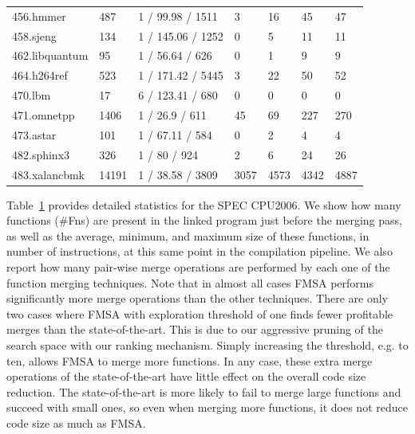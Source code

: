 \begin{table}[h]
{\begin{tabular}{lllllll}
                     456.hmmer          & 487    & 1 / 99.98 / 1511   & \small 3      & \small 16    & \small 45   & \small 47   \\
\rowcolor{evencolor} 458.sjeng          & 134    & 1 / 145.06 / 1252  & \small 0      & \small 5     & \small 11   & \small 11   \\
                     462.libquantum     & 95     & 1 / 56.64 / 626    & \small 0      & \small 1     & \small 9    & \small 9    \\
\rowcolor{evencolor} 464.h264ref        & 523    & 1 / 171.42 / 5445  & \small 3      & \small 22    & \small 50   & \small 52   \\
                     470.lbm            & 17     & 6 / 123.41 / 680   & \small 0      & \small 0     & \small 0    & \small 0    \\
\rowcolor{evencolor} 471.omnetpp        & 1406   & 1 / 26.9 / 611     & \small 45     & \small 69    & \small 227  & \small 270  \\
                     473.astar          & 101    & 1 / 67.11 / 584    & \small 0      & \small 2     & \small 4    & \small 4    \\
\rowcolor{evencolor} 482.sphinx3        & 326    & 1 / 80 / 924       & \small 2      & \small 6     & \small 24   & \small 26   \\
                     483.xalancbmk      & 14191  & 1 / 38.58 / 3809   & \small 3057   & \small 4573  & \small 4342 & \small 4887 \\
\bottomrule
\end{tabular}
}
\label{tab:stats}
\end{table}

Table~\ref{tab:stats} provides detailed statistics for the SPEC CPU2006.
We show how many functions (\#Fns) are present in the linked program
just before the merging pass, as well as
the average, minimum, and maximum size of these functions, in number of instructions, at
this same point in the compilation pipeline.
We also report how many pair-wise merge operations are
performed by each one of the function merging techniques.
Note that in almost all cases FMSA performs significantly more merge operations than the other
techniques.
There are only two cases where FMSA with exploration threshold of one finds fewer
profitable merges than the state-of-the-art. This is due to our aggressive pruning
of the search space with our ranking mechanism. Simply increasing the threshold, e.g. to ten,
allows FMSA to merge more functions. In any case, these extra merge operations of the state-of-the-art
have little effect on the overall code size reduction. The state-of-the-art is more likely to fail to
merge large functions and succeed with small ones, so even when merging more functions, it does not
reduce code size as much as FMSA.

